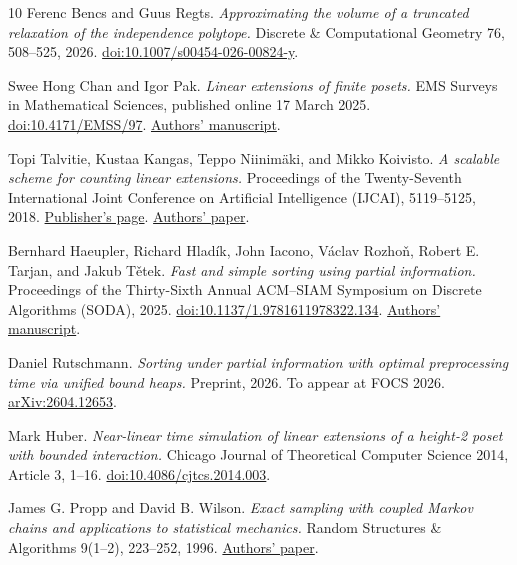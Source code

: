 \begin{thebibliography}{10}
Ferenc Bencs and Guus Regts.
\emph{Approximating the volume of a truncated relaxation of the independence polytope.}
Discrete \& Computational Geometry 76, 508--525, 2026.
\href{https://doi.org/10.1007/s00454-026-00824-y}{doi:10.1007/s00454-026-00824-y}.

Swee Hong Chan and Igor Pak.
\emph{Linear extensions of finite posets.}
EMS Surveys in Mathematical Sciences, published online 17 March 2025.
\href{https://doi.org/10.4171/EMSS/97}{doi:10.4171/EMSS/97}.
\href{https://www.math.ucla.edu/~pak/papers/LEsurvey11.pdf}{Authors' manuscript}.

Topi Talvitie, Kustaa Kangas, Teppo Niinim\"aki, and Mikko Koivisto.
\emph{A scalable scheme for counting linear extensions.}
Proceedings of the Twenty-Seventh International Joint Conference on
Artificial Intelligence (IJCAI), 5119--5125, 2018.
\href{https://www.ijcai.org/proceedings/2018/710}{Publisher's page}.
\href{https://ijcai.org/proceedings/2018/0710.pdf}{Authors' paper}.

Bernhard Haeupler, Richard Hlad\'ik, John Iacono, V\'aclav Rozho\v{n},
Robert E. Tarjan, and Jakub T\v{e}tek.
\emph{Fast and simple sorting using partial information.}
Proceedings of the Thirty-Sixth Annual ACM--SIAM Symposium on Discrete
Algorithms (SODA), 2025.
\href{https://doi.org/10.1137/1.9781611978322.134}{doi:10.1137/1.9781611978322.134}.
\href{https://arxiv.org/abs/2404.04552}{Authors' manuscript}.

Daniel Rutschmann.
\emph{Sorting under partial information with optimal preprocessing time
via unified bound heaps.}
Preprint, 2026. To appear at FOCS 2026.
\href{https://arxiv.org/abs/2604.12653}{arXiv:2604.12653}.

Mark Huber.
\emph{Near-linear time simulation of linear extensions of a height-2
poset with bounded interaction.}
Chicago Journal of Theoretical Computer Science 2014, Article 3, 1--16.
\href{https://doi.org/10.4086/cjtcs.2014.003}{doi:10.4086/cjtcs.2014.003}.

James G. Propp and David B. Wilson.
\emph{Exact sampling with coupled Markov chains and applications to
statistical mechanics.}
Random Structures \& Algorithms 9(1--2), 223--252, 1996.
\href{https://www.stat.berkeley.edu/~aldous/206-RWG/RWGpapers/propp_wilson.pdf}{Authors' paper}.

\end{thebibliography}
